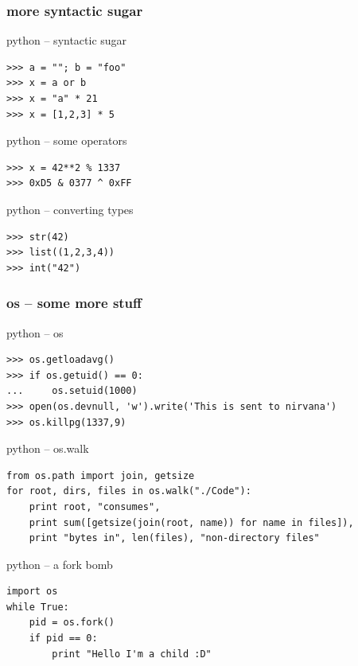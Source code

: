 \documentclass{beamer}
\begin{document}
\begin{frame}[fragile]
	\frametitle{more syntactic sugar}

	\begin{exampleblock}{python -- syntactic sugar}
	\begin{lstlisting}
>>> a = ""; b = "foo"
>>> x = a or b
>>> x = "a" * 21
>>> x = [1,2,3] * 5
	\end{lstlisting}
	\end{exampleblock}

	\begin{exampleblock}{python -- some operators}
	\begin{lstlisting}
>>> x = 42**2 % 1337
>>> 0xD5 & 0377 ^ 0xFF
	\end{lstlisting}
	\end{exampleblock}	
	
	\begin{exampleblock}{python -- converting types}
	\begin{lstlisting}
>>> str(42)
>>> list((1,2,3,4))
>>> int("42")	
	\end{lstlisting}
	\end{exampleblock}
\end{frame}

\begin{frame}
	\frametitle{os -- some more stuff}
	\begin{exampleblock}{python -- os}
	\begin{lstlisting}
>>> os.getloadavg()
>>> if os.getuid() == 0:
...     os.setuid(1000)
>>> open(os.devnull, 'w').write('This is sent to nirvana')
>>> os.killpg(1337,9)
	\end{lstlisting}
	\end{exampleblock}

	\begin{exampleblock}{python -- os.walk}
	\begin{lstlisting}
from os.path import join, getsize
for root, dirs, files in os.walk("./Code"):
    print root, "consumes",
    print sum([getsize(join(root, name)) for name in files]),
    print "bytes in", len(files), "non-directory files"
	\end{lstlisting}
	\end{exampleblock}

\newpage
	\begin{exampleblock}{python -- a fork bomb}
	\begin{lstlisting}
import os
while True:
    pid = os.fork()
    if pid == 0:
        print "Hello I'm a child :D"
	\end{lstlisting}
	\end{exampleblock}
\end{frame}
\end{document}
